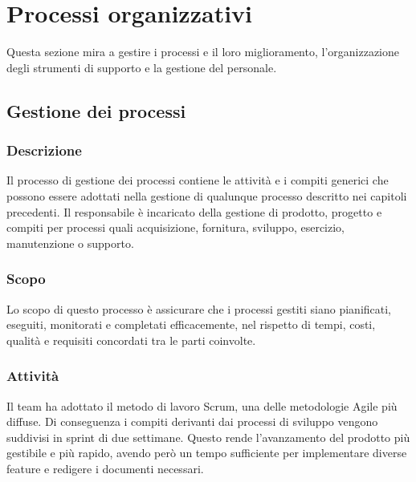 \section{Processi organizzativi}
Questa sezione mira a gestire i processi e il loro miglioramento,
l'organizzazione degli strumenti di supporto e la gestione del personale.

\subsection{Gestione dei processi}
\subsubsection{Descrizione}
Il processo di gestione dei processi contiene le attività e i compiti generici che possono 
essere adottati nella gestione di qualunque processo descritto nei capitoli precedenti. 
Il responsabile è incaricato della gestione di prodotto, progetto e compiti per processi quali acquisizione, 
fornitura, sviluppo, esercizio, manutenzione o supporto.

\subsubsection{Scopo}
Lo scopo di questo processo è assicurare che i processi gestiti siano pianificati, eseguiti, monitorati e completati efficacemente, 
nel rispetto di tempi, costi, qualità e requisiti concordati tra le parti coinvolte.

\subsubsection{Attività}
Il team ha adottato il metodo di lavoro Scrum, una delle metodologie Agile più
diffuse. Di conseguenza i compiti derivanti dai processi di sviluppo vengono
suddivisi in sprint di due settimane. Questo rende l'avanzamento del prodotto
più gestibile e più rapido, avendo però un tempo sufficiente per implementare
diverse feature e redigere i documenti necessari.
\vspace{1em}

